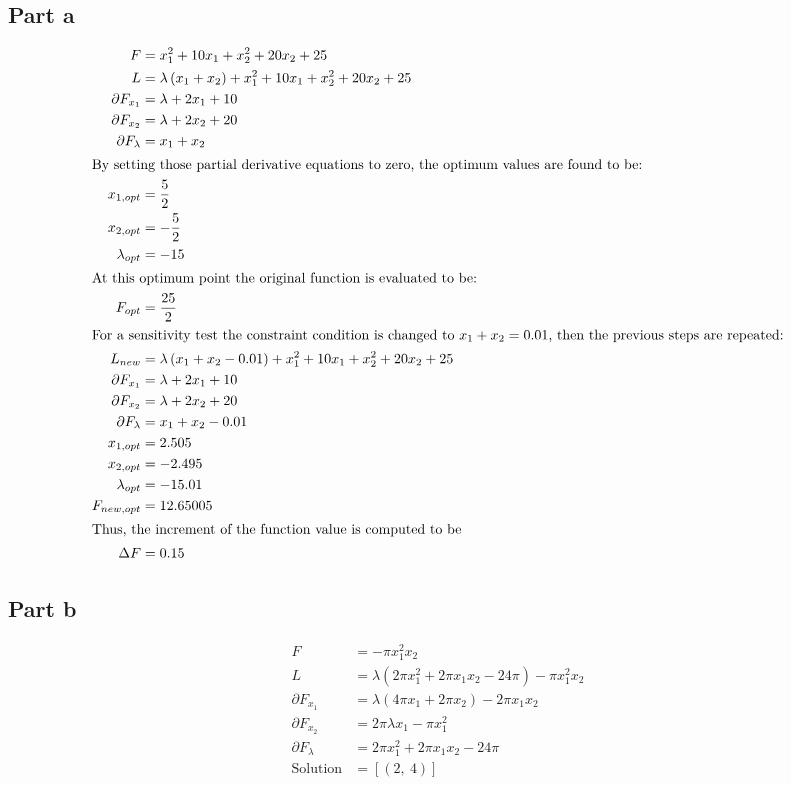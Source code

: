 \documentclass[a4paper,12pt]{article} %
\begin{document}
\subsection*{Part a}
\begin{align*}
    F &= x_{1}^{2} + 10 x_{1} + x_{2}^{2} + 20 x_{2} + 25 \\
    L &= \lambda \left(x_{1} + x_{2}\right) + x_{1}^{2} + 10 x_{1} + x_{2}^{2} + 20 x_{2} + 25 \\
    \partial F_{x_1} &= \lambda + 2 x_{1} + 10 \\
    \partial F_{x_2} &= \lambda + 2 x_{2} + 20 \\
    \partial F_{\lambda} &= x_{1} + x_{2} \\
    \intertext{By setting those partial derivative equations to zero, the optimum values are found to be:}
    x_{1,opt} &= \frac{5}{2} \\
    x_{2,opt} &= - \frac{5}{2} \\
    \lambda_{opt} &= -15 \\
    \intertext{At this optimum point the original function is evaluated to be:}
    F_{opt} &= \frac{25}{2} \\
    \intertext{For a sensitivity test the constraint condition is changed to $x_1 + x_2 = 0.01$, then the previous
    steps are repeated:}
    L_{new} &= \lambda \left(x_{1} + x_{2} - 0.01\right) + x_{1}^{2} + 10 x_{1} + x_{2}^{2} + 20 x_{2} + 25 \\
    \partial F_{x_1} &= \lambda + 2 x_{1} + 10 \\
    \partial F_{x_2} &= \lambda + 2 x_{2} + 20 \\
    \partial F_{\lambda} &= x_{1} + x_{2} - 0.01 \\
    x_{1,opt} &= 2.505 \\
    x_{2,opt} &= -2.495 \\
    \lambda_{opt} &= -15.01\\
    F_{new,opt} &= 12.65005 \\
    \intertext{Thus, the increment of the function value is computed to be}
    \Delta F &= 0.15
\end{align*}

\subsection*{Part b}
\begin{align*}
    F &= - \pi x_{1}^{2} x_{2} \\
    L &= \lambda \left(2 \pi x_{1}^{2} + 2 \pi x_{1} x_{2} - 24 \pi\right) - \pi x_{1}^{2} x_{2} \\
    \partial F_{x_1} &= \lambda \left(4 \pi x_{1} + 2 \pi x_{2}\right) - 2 \pi x_{1} x_{2} \\
    \partial F_{x_2} &= 2 \pi \lambda x_{1} - \pi x_{1}^{2} \\
    \partial F_{\lambda} &= 2 \pi x_{1}^{2} + 2 \pi x_{1} x_{2} - 24 \pi \\
    \text{Solution} &= \left[ \left( 2, \  4\right)\right]
\end{align*}
\newpage
\end{document}
